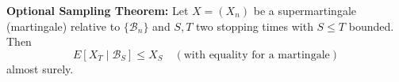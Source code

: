 \textbf{Optional Sampling Theorem:} Let $X = (X_n)$ be a supermartingale (martingale) relative to $\{\mathcal{B}_n\}$ and $S, T$ two stopping times with $S \leq T$ bounded. Then
$$E[X_T \mid \mathcal{B}_S] \leq X_S \quad (\text{with equality for a martingale})$$
almost surely.

